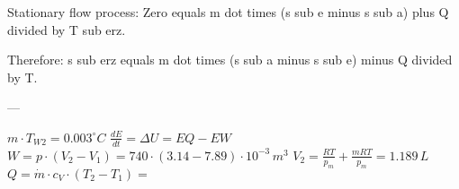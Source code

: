 Stationary flow process:  
Zero equals m dot times (s sub e minus s sub a) plus Q divided by T sub erz.  

Therefore:  
s sub erz equals m dot times (s sub a minus s sub e) minus Q divided by T.  

---

\( m \cdot T_{W2} = 0.003^\circ C \)  
\( \frac{dE}{dt} = \Delta U = EQ - EW \)  
\( W = p \cdot (V_2 - V_1) = 740 \cdot (3.14 - 7.89) \cdot 10^{-3} \, m^3 \)  
\( V_2 = \frac{RT}{p_m} + \frac{mRT}{p_m} = 1.189 \, L \)  
\( Q = \dot{m} \cdot c_V \cdot (T_2 - T_1) = \)